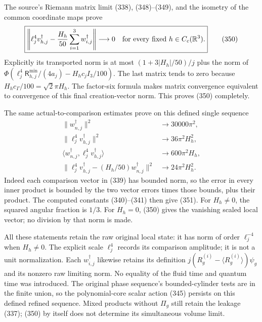 \documentclass[
  11pt,
]{article}
\begin{document}
The source's Riemann matrix limit (338), (348)--(349), and the isometry
of the common coordinate maps prove \[
 \boxed{\left\|\ell_j^4v_{h,j}^\dagger
          -\frac{H_h}{50}\sum_{i=1}^3 w_{i,j}^\dagger
         \right\|\longrightarrow0
          \quad\hbox{for every fixed }h\in C_c(\mathbb R^3).}
 \tag{350}
\] Explicitly its transported norm is at most \((1+3|H_h|/50)/j\) plus
the norm of
\(\Phi(\ell_j^4\mathsf R_{h,j}^{\min}/(4a_j)-H_hc_jI_3/100)\). The last
matrix tends to zero because \(H_hc_\Gamma/100=\sqrt2\pi H_h\). The
factor-six formula makes matrix convergence equivalent to convergence of
this final creation-vector norm. This proves (350) completely.

The same actual-to-comparison estimates prove on this defined single
sequence \[
 \begin{split}
 \|w_{n,j}^\dagger\|^2&\longrightarrow30000\pi^2,\\
 \|\ell_j^4v_{h,j}^\dagger\|^2&\longrightarrow36\pi^2H_h^2,\\
 \langle w_{n,j}^\dagger,\ell_j^4v_{h,j}^\dagger\rangle
                                  &\longrightarrow600\pi^2H_h,\\
 \|\ell_j^4v_{h,j}^\dagger-(H_h/50)w_{n,j}^\dagger\|^2
                                  &\longrightarrow24\pi^2H_h^2.
 \end{split}
 \tag{351}
\] Indeed each comparison vector in (339) has bounded norm, so the error
in every inner product is bounded by the two vector errors times those
bounds, plus their product. The computed constants (340)--(341) then
give (351). For \(H_h\ne0\), the squared angular fraction is \(1/3\).
For \(H_h=0\), (350) gives the vanishing scaled local vector; no
division by that norm is made.

All these statements retain the raw original local state: it has norm of
order \(\ell_j^{-4}\) when \(H_h\ne0\). The explicit scale \(\ell_j^4\)
records its comparison amplitude; it is not a unit normalization. Each
\(w_{i,j}^\dagger\) likewise retains its definition
\(j(R_g^{(i)}-\langle R_g^{(i)}\rangle)\psi_g\) and its nonzero raw
limiting norm. No equality of the fluid time and quantum time was
introduced. The original phase sequence's bounded-cylinder tests are in
the finite union, so the polynomial-core scalar action (345) persists on
this defined refined sequence. Mixed products without \(\Pi_g\) still
retain the leakage (337); (350) by itself does not determine its
simultaneous volume limit.
\end{document}
